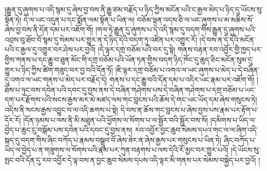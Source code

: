 །རྒྱུན་དུ་ཞུགས་པ་འདི་སྙམ་དུ་ཞེས་བྱ་བས་ནི་རྒྱུ་ཙམ་བརྗོད་པ་ཉིད་ཀྱིས་མངོན་པའི་ང་རྒྱལ་མེད་པ་ཉིད་དུ་ཡོངས་སུ་སྟོན་ཏེ། དེ་ལ་ཡང་འདུན་པ་དང་སྨོན་ལམ་སྟོན་པ་ཡིན་ལ། བཅོམ་ལྡན་འདས་ཅི་ལ་ཡང་ཞུགས་པ་མ་མཆིས་སོ་ཞེས་བྱ་བས་ནི་དོན་དམ་པར་འཇོག་གོ། །གལ་ཏེ་རྒྱུན་དུ་ཞུགས་པ་དེ་འདི་སྙམ་དུ་བདག་གིས་རྒྱུན་དུ་ཞུགས་པའི་འབྲས་བུ་ཐོབ་བོ་སྙམ་དུ་སེམས་པར་གྱུར་ན་དེ་ཉིད་དེའི་བདག་ཏུ་འཛིན་པར་འགྱུར་རོ། །དེ་བས་ན་དེ་དེའི་མངོན་པའི་ང་རྒྱལ་དུ་འགྱུར་བར་ཤེས་པར་བྱའོ། །དེ་ལྟར་དགྲ་བཅོམ་པའི་བར་དུ་སྟེ། གནས་བརྟན་རབ་འབྱོར་གྱི་ཁྱད་པར་གྱིས་གནས་པ་དང་རྒྱུ་བ་ཐུན་མོང་གི་དགྲ་བཅོམ་པའི་ཡོན་ཏན་གྱིས་བདག་ཉིད་ཁོང་དུ་ཆུད་ཅིང་མངོན་སུམ་དུ་གྱུར་པ་ཉིད་ཀྱིས་ཚིག་གཟུང་བར་བྱ་བའི་དོན་ཏོ། །ཇི་ལྟར་དགྲ་བཅོམ་པ་འགའ་ལ་ཡང་ཞུགས་པ་མེད་པ་དེ་བཞིན་དུ་འགའ་ལ་ཡང་གནས་པ་མེད་པར་བརྗོད་དེ། གནས་པ་དང་རྒྱུ་བའི་དོན་དམ་པ་འདིར་ཡང་རྣམ་པར་འཇོག་གོ། །ཐོས་པ་ཉུང་བས་དབེན་པའི་དབང་དུ་བྱས་ནས་དེ་བཞིན་གཤེགས་པས་དེ་བཞིན་གཤེགས་པ་དགྲ་བཅོམ་པ་ཡང་དག་པར་རྫོགས་པའི་སངས་རྒྱས་མར་མེ་མཛད་ལས་གང་བླངས་པའི་ཆོས་དེ་གང་ཡང་ཡོད་དམ་ཞེས་གསུངས་ཏེ། འདིས་ནི་སངས་རྒྱས་འབྱུང་བ་ལ་འདི་ཆགས་པ་སྟེ། དེ་བས་ན་ཆོས་གང་བླངས་པ་ཞེས་བྱས་པས་རྣམ་པར་རྟོག་པ་དོར་རོ། །དོན་ཉམས་པ་ལས་ནི་མི་མཐུན་པའི་ཕྱོགས་ལ་སོགས་པ་ལ་སྦྱོར་བའི་སྦྱོར་བས་སོ། །དམིགས་པ་ཡིད་ལ་བྱེད་པ་ཆུང་ངུ་བསྒོམ་པས་དབེན་པའི་དབང་དུ་བྱས་ནས། རབ་འབྱོར་བྱང་ཆུབ་སེམས་དཔའ་གང་ལ་ལ་ཞིག་འདི་སྐད་དུ་བདག་གིས་ཞིང་བཀོད་པ་རྣམས་བསྒྲུབ་བོ་ཞེས་ཟེར་ན་ཞེས་རྒྱས་པར་གསུངས་པ་ཡིན་ཏེ། ཞིང་བཀོད་པ་ཡིད་ལ་བྱེད་པ་ན་གཟུགས་ལ་སོགས་པའི་རྣམ་པར་ཀུན་བརྟགས་པ་ལས་དེའི་རོ་མྱང་བར་གྱུར་པའོ། །དེ་ཡོངས་སུ་སྤང་བའི་དོན་དུ་རབ་འབྱོར་དེ་ལྟ་བས་ན་བྱང་ཆུབ་སེམས་དཔས་འདི་ལྟར་མི་གནས་པར་སེམས་བསྐྱེད་པར་བྱའོ། །
